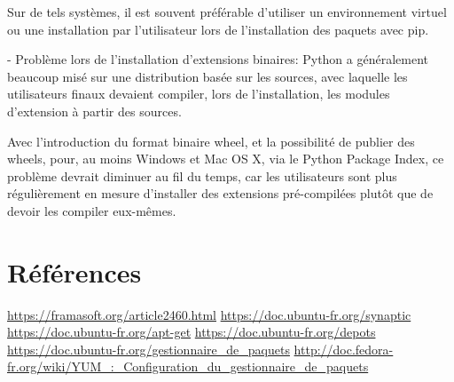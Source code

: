 \documentclass[a4paper,12pt]{article}
\begin{document}
Sur de tels systèmes, il est souvent préférable d’utiliser un environnement virtuel ou une installation par l’utilisateur lors de l’installation des paquets avec pip.

- Problème lors de l'installation d'extensions binaires:
Python a généralement beaucoup misé sur une distribution basée sur les sources, avec laquelle les utilisateurs finaux devaient compiler, lors de l’installation, les modules d’extension à partir des sources.

Avec l’introduction du format binaire wheel, et la possibilité de publier des wheels, pour, au moins Windows et Mac OS X, via le Python Package Index, ce problème devrait diminuer au fil du temps, car les utilisateurs sont plus régulièrement en mesure d’installer des extensions pré-compilées plutôt que de devoir les compiler eux-mêmes.

\clearpage
\section{Références}

\url{https://framasoft.org/article2460.html}
\url{https://doc.ubuntu-fr.org/synaptic}
\url{https://doc.ubuntu-fr.org/apt-get}
\url{https://doc.ubuntu-fr.org/depots}
\url{https://doc.ubuntu-fr.org/gestionnaire_de_paquets}
\url{http://doc.fedora-fr.org/wiki/YUM_:_Configuration_du_gestionnaire_de_paquets}
\end{document}

